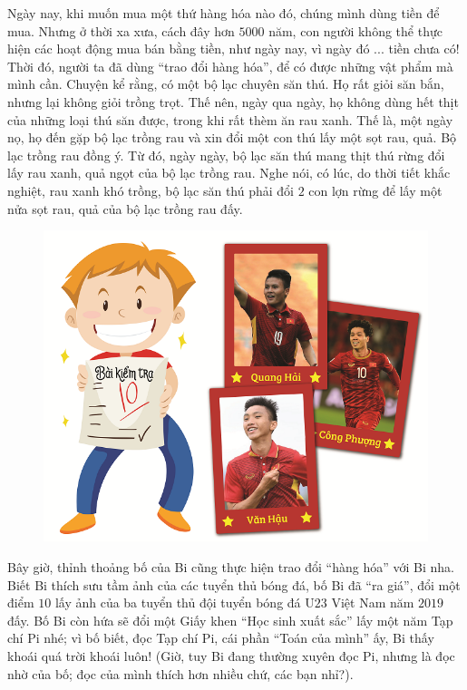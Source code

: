	Ngày nay, khi muốn mua một thứ hàng hóa nào đó, chúng mình dùng tiền để mua. Nhưng ở thời xa xưa, cách đây hơn $5000$ năm, con người không thể thực hiện các hoạt động mua bán bằng tiền, như ngày nay, vì ngày đó ... tiền chưa có! Thời đó, người ta đã dùng “trao đổi hàng hóa”, để có được những vật phẩm mà mình cần. Chuyện kể rằng, có một bộ lạc chuyên săn thú. Họ rất giỏi săn bắn, nhưng lại không giỏi trồng trọt. Thế nên, ngày qua ngày, họ không dùng hết thịt của những loại thú săn được, trong khi rất thèm ăn rau xanh. Thế là, một ngày nọ, họ đến gặp bộ lạc trồng rau và xin đổi một con thú lấy một sọt rau, quả. Bộ lạc trồng rau đồng ý. Từ đó, ngày ngày, bộ lạc săn thú mang thịt thú
	rừng đổi lấy rau xanh, quả ngọt của bộ lạc trồng rau. Nghe nói, có lúc, do thời tiết khắc nghiệt, rau xanh khó trồng, bộ lạc săn thú phải đổi $2$ con lợn rừng để lấy một nửa sọt rau, quả của bộ lạc trồng rau đấy.
	\vskip 0.01cm
	\begin{figure}
		\centering
		\vspace*{-20pt}
		\captionsetup{labelformat= empty, justification=centering}
		\includegraphics[width=1\linewidth]{pic3}
		\vspace*{-25pt}
	\end{figure}	
	Bây giờ, thỉnh thoảng bố của Bi cũng thực hiện trao đổi “hàng hóa” với Bi nha. Biết Bi thích sưu tầm ảnh của các tuyển thủ bóng đá, bố Bi đã “ra giá”, đổi một điểm $10$ lấy ảnh của ba tuyển thủ đội tuyển bóng đá U$23$ Việt Nam năm $2019$ đấy. Bố Bi còn hứa sẽ đổi một Giấy khen “Học sinh xuất sắc” lấy một năm Tạp chí Pi nhé; vì bố biết, đọc Tạp chí Pi, cái phần “Toán của  mình” ấy, Bi thấy khoái quá trời khoái luôn! (Giờ, tuy Bi đang thường xuyên đọc Pi, nhưng là đọc nhờ của bố; đọc của mình thích hơn nhiều chứ, các bạn nhỉ?).
